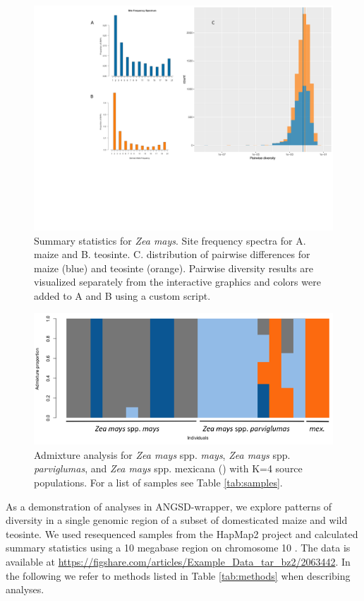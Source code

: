 \documentclass[10pt,a4paper]{article}
\begin{document}
\begin{figure}
\centering
\includegraphics[width=\linewidth]{figures/figure3big.pdf}
\caption{Summary statistics for {\it Zea mays}. Site frequency spectra for A. maize and B. teosinte. C. distribution of pairwise differences for maize (blue) and teosinte (orange). Pairwise diversity results are visualized separately from the interactive graphics and colors were added to A and B using a custom script.}
\label{fig:figure3}
\end{figure}

\begin{figure}
\centering
\includegraphics[width=\linewidth]{figures/mt4labeled.png}
\caption{Admixture analysis for {\it Zea mays} spp. {\it mays}, {\it Zea mays} spp. {\it parviglumas}, and {\it Zea mays} spp. {mexicana} () with K=4 source populations. For a list of samples see Table \ref{tab:samples}. }
\label{fig:admixture}
\end{figure}

As a demonstration of analyses in ANGSD-wrapper, we explore patterns of diversity in a single genomic region of a subset of domesticated maize and wild teosinte. We used resequenced samples from the HapMap2 project  and calculated summary statistics using a 10 megabase region on chromosome 10 \citep{chia2012maize}. The data is available at \url{https://figshare.com/articles/Example_Data_tar_bz2/2063442}. In the following we refer to methods listed in Table \ref{tab:methods} when describing analyses.
\end{document}
